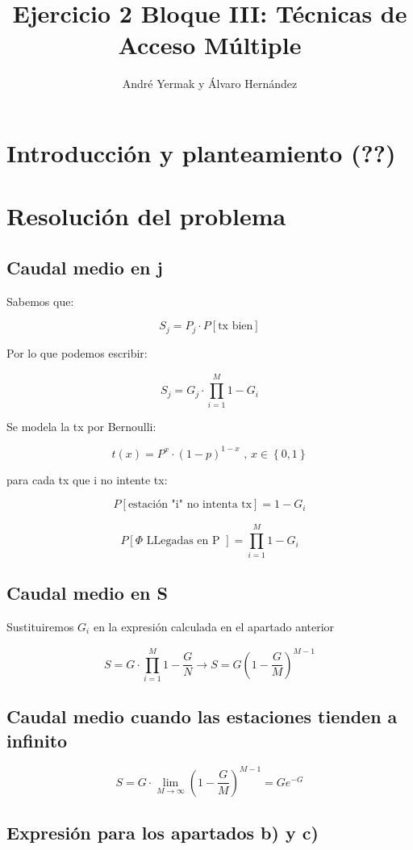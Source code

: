 \documentclass{article}
\title{Ejercicio 2 Bloque III: Técnicas de Acceso Múltiple}
\author{André Yermak y Álvaro Hernández}
\begin{document}
\maketitle


\section{Introducción y planteamiento (??)}


\section{Resolución del problema}
\subsection{Caudal medio en j}
Sabemos que:

$$S_j = P_j \cdot P[\text{tx bien}]$$

Por lo que podemos escribir:

$$S_j = G_j \cdot \prod_{i=1}^{\substack{M}} 1 - G_i$$

Se modela la tx por Bernoulli:

$$t(x) = P^x \cdot (1-p)^{1-x} \text{ , } x \in \left\{0, 1\right\}$$


para cada tx que i no intente tx:

$$P[\text{estación "i" no intenta tx}] = 1 - G_{i}$$

$$P[ \varPhi \text{ LLegadas en P } ] = \prod_{i=1}^{\substack{M}} 1 - G_i $$




\subsection{Caudal medio en S}

Sustituiremos $G_{i}$ en la expresión calculada en el apartado anterior

$$S = G \cdot \prod_{i=1}^{\substack{M}} 1 - \frac{G}{N} \rightarrow S = G(1 - \frac{G}{M})^{M-1}$$


\subsection{Caudal medio cuando las estaciones tienden a infinito}

$$S = G \cdot \lim_{M \to \infty}(1 - \frac{G}{M})^{M-1} = Ge^{-G}$$

\subsection{Expresión para los apartados b) y c) }
\end{document}
